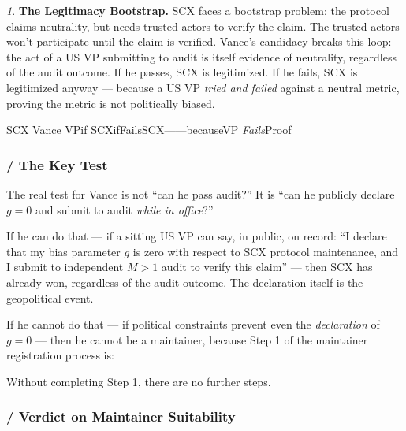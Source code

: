 \documentclass[12pt,a4paper]{article}
\theoremstyle{remark}
\newtheorem{govinsight}{}[section]
\newenvironment{govbox}{%
  \begin{center}
  \color{insightblue}
  \begin{minipage}{0.92\textwidth}
  \begin{govinsight}
}{%
  \end{govinsight}
  \end{minipage}
  \end{center}
}
\begin{document}
\begin{govbox}
\textbf{The Legitimacy Bootstrap.}
SCX faces a bootstrap problem: the protocol claims neutrality, but needs
trusted actors to verify the claim. The trusted actors won't participate
until the claim is verified. Vance's candidacy breaks this loop: the act of
a US VP submitting to audit is itself evidence of neutrality, regardless of
the audit outcome. If he passes, SCX is legitimized. If he fails, SCX is
legitimized anyway — because a US VP \textit{tried and failed} against a
neutral metric, proving the metric is not politically biased.

\textbf{}
SCX
Vance
VPif
SCXifFailsSCX——becauseVP\textit{
Fails}Proof
\end{govbox}

\subsubsection{ / The Key Test}

The real test for Vance is not ``can he pass audit?'' It is ``can he publicly
declare $g=0$ and submit to audit \textit{while in office}?''

If he can do that — if a sitting US VP can say, in public, on record: ``I
declare that my bias parameter $g$ is zero with respect to SCX protocol
maintenance, and I submit to independent $M>1$ audit to verify this claim'' —
then SCX has already won, regardless of the audit outcome. The declaration
itself is the geopolitical event.

If he cannot do that — if political constraints prevent even the
\textit{declaration} of $g=0$ — then he cannot be a maintainer, because
Step 1 of the maintainer registration process is:

\begin{center}
\end{center}

Without completing Step 1, there are no further steps.

\subsubsection{ / Verdict on Maintainer Suitability}
\end{document}

